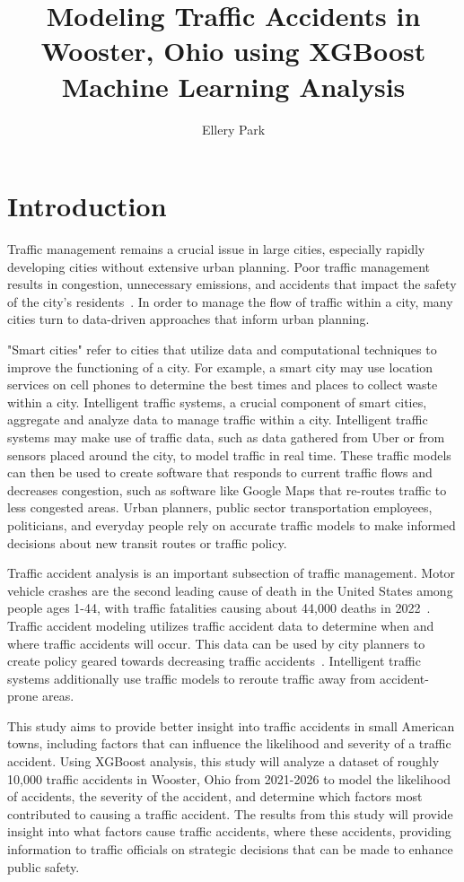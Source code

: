 \documentclass[12pt]{article}
\title{\textbf{Modeling Traffic Accidents in Wooster, Ohio using XGBoost Machine Learning Analysis}}
\author{Ellery Park}
\begin{document}
\maketitle

\section{Introduction}
Traffic management remains a crucial issue in large cities, especially rapidly developing cities without extensive urban planning.
Poor traffic management results in congestion, unnecessary emissions, and accidents that impact the safety of the city's residents~\cite{delaTorre}.
In order to manage the flow of traffic within a city, many cities turn to data-driven approaches that inform urban planning.

"Smart cities" refer to cities that utilize data and computational techniques to improve the functioning of a city. 
For example, a smart city may use location services on cell phones to determine the best times and places to collect waste within a city. 
Intelligent traffic systems, a crucial component of smart cities, aggregate and analyze data to manage traffic within a city. 
Intelligent traffic systems may make use of traffic data, such as data
gathered from Uber or from sensors placed around the city, to model traffic in real time. 
These traffic models can then be used to create software that responds to current traffic flows and decreases congestion, 
such as software like Google Maps that re-routes traffic to less congested areas. Urban planners, public sector transportation 
employees, politicians, and everyday people rely on accurate traffic models to make informed decisions about new transit routes
or traffic policy.

Traffic accident analysis is an important subsection of traffic management. Motor vehicle crashes are the second leading cause of death
in the United States among people ages 1-44, with traffic fatalities causing about 44,000 deaths in 2022~\cite{odphp}.
Traffic accident modeling utilizes traffic accident data to determine when and where traffic accidents will occur. This data can 
be used by city planners to create policy geared towards decreasing traffic accidents~\cite{Givoni}.
Intelligent traffic systems additionally use traffic models to reroute traffic away from accident-prone areas. 

This study aims to provide better insight into traffic accidents in small American towns, including factors that can influence 
the likelihood and severity of a traffic accident. Using XGBoost analysis, 
this study will analyze a dataset of roughly 10,000 traffic accidents in Wooster, Ohio from 2021-2026 to model the 
likelihood of accidents, the severity of the accident, and determine which factors most contributed to causing a traffic accident. 
The results from this study will provide insight into what factors cause traffic accidents, where these accidents, providing
information to traffic officials on strategic decisions that can be made to enhance public safety. 
\end{document}
